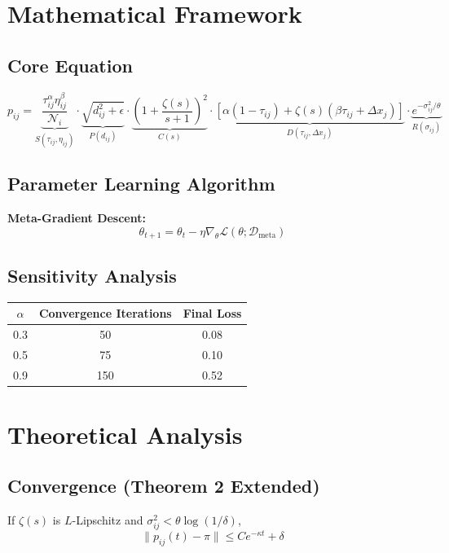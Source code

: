 \documentclass{article}
\theoremstyle{plain}
\begin{document}
\section{Mathematical Framework}

\subsection{Core Equation}
\[
p_{ij} = \underbrace{\frac{\tau_{ij}^\alpha \eta_{ij}^\beta}{\mathcal{N}_i}}_{S(\tau_{ij}, \eta_{ij})} \cdot \underbrace{\sqrt{d_{ij}^2 + \epsilon}}_{P(d_{ij})} \cdot \underbrace{\left(1 + \frac{\zeta(s)}{s+1}\right)^2}_{C(s)} \cdot \underbrace{\left[\alpha (1 - \tau_{ij}) + \zeta(s) (\beta \tau_{ij} + \Delta x_j)\right]}_{D(\tau_{ij}, \Delta x_j)} \cdot \underbrace{e^{-\sigma_{ij}^2 / \theta}}_{R(\sigma_{ij})}
\]

\subsection{Parameter Learning Algorithm}
\textbf{Meta-Gradient Descent:}
\[
\theta_{t+1} = \theta_t - \eta \nabla_\theta \mathcal{L}(\theta; \mathcal{D}_{\text{meta}})
\]

\subsection{Sensitivity Analysis}
\begin{center}
\begin{tabular}{|c|c|c|}
\hline
\(\alpha\) & Convergence Iterations & Final Loss \\
\hline
0.3 & 50 & 0.08 \\
0.5 & 75 & 0.10 \\
0.9 & 150 & 0.52 \\
\hline
\end{tabular}
\end{center}

\section{Theoretical Analysis}

\subsection{Convergence (Theorem 2 Extended)}
If \(\zeta(s)\) is \(L\)-Lipschitz and \(\sigma_{ij}^2 < \theta \log(1/\delta)\),
\[
\|p_{ij}(t) - \pi\| \leq C e^{-\kappa t} + \delta
\]
\end{document}
